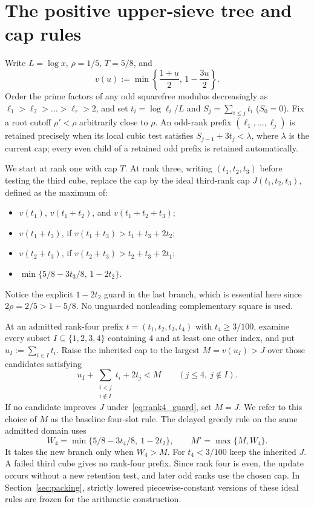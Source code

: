 \documentclass[11pt,reqno]{amsart}
\theoremstyle{remark}
\numberwithin{equation}{section}
\begin{document}
\section{The positive upper-sieve tree and cap rules}\label{sec:tree}

Write $L = \log x$, $\rho = 1/5$, $T = 5/8$, and
\[
v(u) := \min\left\{\frac{1+u}{2},\, 1 - \frac{3u}{2}\right\}.
\]
Order the prime factors of any odd squarefree modulus decreasingly as $\ell_1 > \ell_2 > \dots > \ell_r > 2$, and set $t_i = \log \ell_i/L$ and $S_j = \sum_{i \le j} t_i$ ($S_0 = 0$). Fix a root cutoff $\rho' < \rho$ arbitrarily close to $\rho$. An odd-rank prefix $(\ell_1,\dots,\ell_j)$ is retained precisely when its local cubic test satisfies $S_{j-1} + 3t_j < \lambda$, where $\lambda$ is the current cap; every even child of a retained odd prefix is retained automatically.

We start at rank one with cap $T$. At rank three, writing $(t_1,t_2,t_3)$ before testing the third cube, replace the cap by the ideal third-rank cap $J(t_1,t_2,t_3)$, defined as the maximum of:
\begin{itemize}
\item $v(t_1)$, $v(t_1+t_2)$, and $v(t_1+t_2+t_3)$;
\item $v(t_1+t_3)$, if $v(t_1+t_3) > t_1 + t_3 + 2t_2$;
\item $v(t_2+t_3)$, if $v(t_2+t_3) > t_2 + t_3 + 2t_1$;
\item $\min\{5/8 - 3t_3/8,\, 1 - 2t_2\}$.
\end{itemize}
Notice the explicit $1 - 2t_2$ guard in the last branch, which is essential here since $2\rho = 2/5 > 1 - 5/8$. No unguarded nonleading complementary square is used.

At an admitted rank-four prefix $t = (t_1,t_2,t_3,t_4)$ with $t_4 \ge 3/100$, examine every subset $I \subseteq \{1,2,3,4\}$ containing $4$ and at least one other index, and put $u_I := \sum_{i \in I} t_i$. Raise the inherited cap to the largest $M = v(u_I) > J$ over those candidates satisfying
\begin{equation}\label{eq:rank4_guard}
u_I + \sum_{\substack{i < j\\ i \notin I}} t_i + 2t_j < M \qquad (j \le 4,\ j \notin I).
\end{equation}
If no candidate improves $J$ under~\eqref{eq:rank4_guard}, set $M=J$. We refer to this choice of $M$ as the baseline four-slot rule. The delayed greedy rule on the same admitted domain uses
\begin{equation}\label{eq:w4_cap}
W_4=\min\{5/8-3t_4/8,\ 1-2t_2\},\qquad M'=\max\{M,W_4\}.
\end{equation}
It takes the new branch only when $W_4>M$. For $t_4<3/100$ keep the inherited $J$. A failed third cube gives no rank-four prefix. Since rank four is even, the update occurs without a new retention test, and later odd ranks use the chosen cap. In Section~\ref{sec:packing}, strictly lowered piecewise-constant versions of these ideal rules are frozen for the arithmetic construction.
\end{document}
